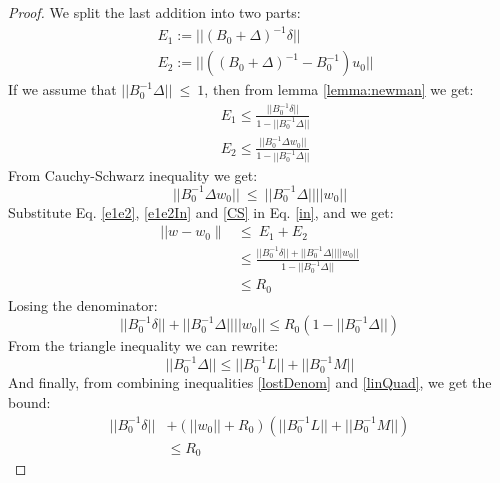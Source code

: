 \documentclass[11pt,twocolumn,varwidth=true,a4paper,fleqn]{article}
\begin{document}
\begin{proof}
We split the last addition into two parts:
\begin{equation}  \label{e1e2}
\begin{split}
& E_1:= ||(B_0+\Delta)^{-1}\delta|| \\
& E_2:= ||((B_0+\Delta)^{-1} - B_0^{-1})u_0||
\end{split}
\end{equation}
If we assume that $||B_0^{-1}\Delta||\ \leq \ 1$, 
then from lemma \ref{lemma:newman} we get:
\begin{equation} \label{e1e2In}
\begin{split}
& E_1 \leq \frac{||B_0^{-1}\delta||}{1-||B_0^{-1}\Delta||} \\
& E_2 \leq  \frac{|| B_0^{-1}\Delta w_0||}{1-||B_0^{-1}\Delta||}
\end{split}
\end{equation}
From Cauchy-Schwarz inequality we get:
\begin{equation} \label{CS}
||B_0^{-1}\Delta w_0|| \ \leq \ ||B_0^{-1}\Delta||||w_0||
\end{equation}
Substitute Eq. \ref{e1e2}, \ref{e1e2In} and \ref{CS} in Eq. \ref{in}, and we
get:
\begin{equation}
\begin{split}
|| w-w_0 \parallel & \leq \ E_1+E_2 \\
& \leq \frac{||B_0^{-1}\delta|| + ||B_0^{-1}\Delta||||w_0||}{1 -||B_0^{-1}\Delta||} \\
& \leq R_0
\end{split}
\end{equation}
Losing the denominator:
\begin{equation} \label{lostDenom}
||B_0^{-1}\delta|| + ||B_0^{-1}\Delta||||w_0||
\leq R_0(1 -||B_0^{-1}\Delta||)
\end{equation}
From the triangle inequality we can rewrite:
\begin{equation} \label{linQuad}
||B_0^{-1}\Delta|| \leq ||B_0^{-1}L||+||B_0^{-1}M||
\end{equation}
And finally, from combining inequalities \ref{lostDenom} and \ref{linQuad},
we get the bound:
\begin{equation} \label{convexBound}
\begin{split}
||B_0^{-1}\delta|| &+ (||w_0||+R_0)(||B_0^{-1}L||+||B_0^{-1}M||) \\ & \leq  R_0
\end{split}
\end{equation}
\end{proof}
\end{document}
